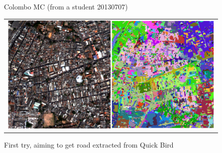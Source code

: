 \documentclass[xcolor=dvipsnames,beamer]{beamer} %
\begin{document}
\begin{frame}[fragile]{Colombo MC (from a student 20130707)}

\begin{center}
\begin{tabular}{l}
\includegraphics[width=5.5cm]{Qbird_orig}\includegraphics[width=5.5cm]{Qbird_seg}
\end{tabular}
First try, aiming to get road extracted from Quick Bird
\end{center}

\end{frame}
\end{document}
